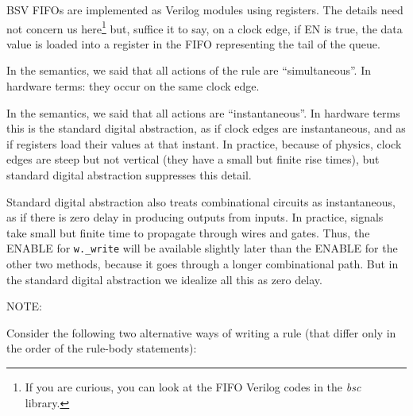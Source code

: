 BSV FIFOs are implemented as Verilog modules using registers.  The
details need not concern us here\footnote{If you are curious, you can
look at the FIFO Verilog codes in the \emph{bsc} library.} but,
suffice it to say, on a clock edge, if EN is true, the data value is
loaded into a register in the FIFO representing the tail of the queue.

In the semantics, we said that all actions of the rule are
``simultaneous''.  In hardware terms: they occur on the same clock
edge.

In the semantics, we said that all actions are ``instantaneous''.  In
hardware terms this is the standard digital abstraction, as if clock
edges are instantaneous, and as if registers load their values at that
instant.  In practice, because of physics, clock edges are steep but
not vertical (they have a small but finite rise times), but standard
digital abstraction suppresses this detail.

Standard digital abstraction also treats combinational circuits as
instantaneous, as if there is zero delay in producing outputs from
inputs.  In practice, signals take small but finite time to propagate
through wires and gates. Thus, the ENABLE for \verb|w._write| will be
available slightly later than the ENABLE for the other two methods,
because it goes through a longer combinational path.  But in the
standard digital abstraction we idealize all this as zero delay.

\vspace{2ex}

NOTE: 

\vspace{2ex}

\hdivider

\Exercise

Consider the following two alternative ways of writing a rule (that
differ only in the order of the rule-body statements):

